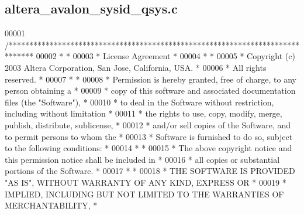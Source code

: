 \subsection{altera\+\_\+avalon\+\_\+sysid\+\_\+qsys.\+c}
\label{altera__avalon__sysid__qsys_8c_source}

\begin{DoxyCode}
00001 \textcolor{comment}{/******************************************************************************}
00002 \textcolor{comment}{*                                                                             *}
00003 \textcolor{comment}{* License Agreement                                                           *}
00004 \textcolor{comment}{*                                                                             *}
00005 \textcolor{comment}{* Copyright (c) 2003 Altera Corporation, San Jose, California, USA.           *}
00006 \textcolor{comment}{* All rights reserved.                                                        *}
00007 \textcolor{comment}{*                                                                             *}
00008 \textcolor{comment}{* Permission is hereby granted, free of charge, to any person obtaining a     *}
00009 \textcolor{comment}{* copy of this software and associated documentation files (the "Software"),  *}
00010 \textcolor{comment}{* to deal in the Software without restriction, including without limitation   *}
00011 \textcolor{comment}{* the rights to use, copy, modify, merge, publish, distribute, sublicense,    *}
00012 \textcolor{comment}{* and/or sell copies of the Software, and to permit persons to whom the       *}
00013 \textcolor{comment}{* Software is furnished to do so, subject to the following conditions:        *}
00014 \textcolor{comment}{*                                                                             *}
00015 \textcolor{comment}{* The above copyright notice and this permission notice shall be included in  *}
00016 \textcolor{comment}{* all copies or substantial portions of the Software.                         *}
00017 \textcolor{comment}{*                                                                             *}
00018 \textcolor{comment}{* THE SOFTWARE IS PROVIDED "AS IS", WITHOUT WARRANTY OF ANY KIND, EXPRESS OR  *}
00019 \textcolor{comment}{* IMPLIED, INCLUDING BUT NOT LIMITED TO THE WARRANTIES OF MERCHANTABILITY,    *}

\end{DoxyCode}
